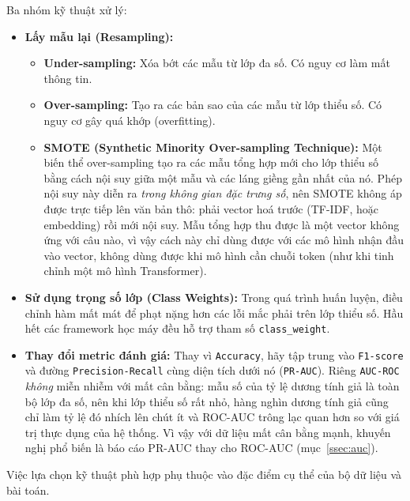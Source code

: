 Ba nhóm kỹ thuật xử lý:
\begin{itemize}
    \item \textbf{Lấy mẫu lại (Resampling):}
        \begin{itemize}
            \item \textbf{Under-sampling:} Xóa bớt các mẫu từ lớp đa số. Có nguy cơ làm mất thông tin.
            \item \textbf{Over-sampling:} Tạo ra các bản sao của các mẫu từ lớp thiểu số. Có nguy cơ gây quá khớp (overfitting).
            \item \textbf{SMOTE (Synthetic Minority Over-sampling Technique):} Một biến thể over-sampling tạo ra các mẫu tổng hợp mới cho lớp thiểu số bằng cách nội suy giữa một mẫu và các láng giềng gần nhất của nó. Phép nội suy này diễn ra \emph{trong không gian đặc trưng số}, nên SMOTE không áp được trực tiếp lên văn bản thô: phải vector hoá trước (TF-IDF, hoặc embedding) rồi mới nội suy. Mẫu tổng hợp thu được là một vector không ứng với câu nào, vì vậy cách này chỉ dùng được với các mô hình nhận đầu vào vector, không dùng được khi mô hình cần chuỗi token (như khi tinh chỉnh một mô hình Transformer).
        \end{itemize}
    \item \textbf{Sử dụng trọng số lớp (Class Weights):} Trong quá trình huấn luyện, điều chỉnh hàm mất mát để phạt nặng hơn các lỗi mắc phải trên lớp thiểu số. Hầu hết các framework học máy đều hỗ trợ tham số \texttt{class\_weight}.
    \item \textbf{Thay đổi metric đánh giá:} Thay vì \texttt{Accuracy}, hãy tập trung vào \texttt{F1-score} và đường \texttt{Precision-Recall} cùng diện tích dưới nó (\texttt{PR-AUC}). Riêng \texttt{AUC-ROC} \emph{không} miễn nhiễm với mất cân bằng: mẫu số của tỷ lệ dương tính giả là toàn bộ lớp đa số, nên khi lớp thiểu số rất nhỏ, hàng nghìn dương tính giả cũng chỉ làm tỷ lệ đó nhích lên chút ít và ROC-AUC trông lạc quan hơn so với giá trị thực dụng của hệ thống. Vì vậy với dữ liệu mất cân bằng mạnh, khuyến nghị phổ biến là báo cáo PR-AUC thay cho ROC-AUC (mục~\ref{ssec:auc}).
\end{itemize}
Việc lựa chọn kỹ thuật phù hợp phụ thuộc vào đặc điểm cụ thể của bộ dữ liệu và bài toán.